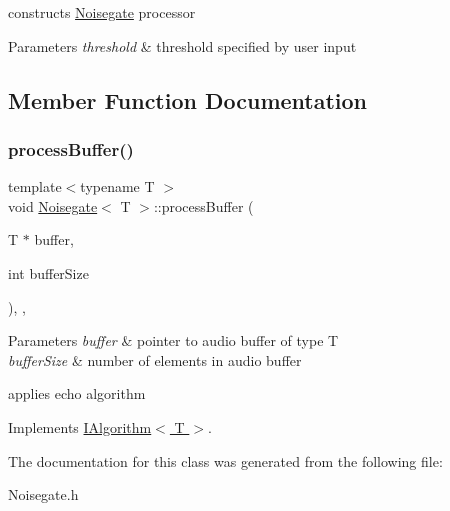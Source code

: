 constructs \hyperlink{classNoisegate}{Noisegate} processor 
\begin{DoxyParams}{Parameters}
{\em threshold} & threshold specified by user input \\
\hline
\end{DoxyParams}


\subsection{Member Function Documentation}
\mbox{\label{classNoisegate_a4ab84c99ea64beb3015134756a358eb9}} 
\subsubsection{\texorpdfstring{process\+Buffer()}{processBuffer()}}
{\footnotesize\ttfamily template$<$typename T $>$ \\
void \hyperlink{classNoisegate}{Noisegate}$<$ T $>$\+::process\+Buffer (\begin{DoxyParamCaption}\item[{T $\ast$}]{buffer,  }\item[{int}]{buffer\+Size }\end{DoxyParamCaption})\hspace{0.3cm}{\ttfamily [inline]}, {\ttfamily [override]}, {\ttfamily [virtual]}}


\begin{DoxyParams}{Parameters}
{\em buffer} & pointer to audio buffer of type T \\
\hline
{\em buffer\+Size} & number of elements in audio buffer\\
\hline
\end{DoxyParams}
applies echo algorithm 

Implements \hyperlink{classIAlgorithm}{I\+Algorithm$<$ T $>$}.



The documentation for this class was generated from the following file\+:\begin{DoxyCompactItemize}
\item 
Noisegate.\+h\end{DoxyCompactItemize}
